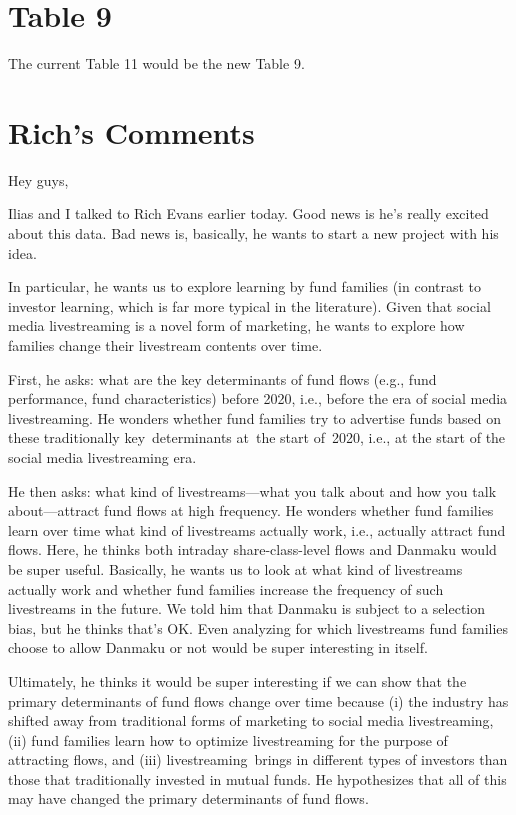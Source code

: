 \documentclass[12pt]{article}
\begin{document}
\section{Table 9}
The current Table 11 would be the new Table 9.

\section*{Rich's Comments}

Hey guys,

Ilias and I talked to Rich Evans earlier today. Good news is he's really excited about this data. Bad news is, basically, he wants to start a new project with his idea.

In particular, he wants us to explore learning by fund families (in contrast to investor learning, which is far more typical in the literature). Given that social media livestreaming is a novel form of marketing, he wants to explore how families change their livestream contents over time.

First, he asks: what are the key determinants of fund flows (e.g., fund performance, fund characteristics) before 2020, i.e., before the era of social media livestreaming.
He wonders whether fund families try to advertise funds based on these traditionally key determinants at the start of 2020, i.e., at the start of the social media livestreaming era.

He then asks: what kind of livestreams---what you talk about and how you talk about---attract fund flows at high frequency.
He wonders whether fund families learn over time what kind of livestreams actually work, i.e., actually attract fund flows. Here, he thinks both intraday share-class-level flows and Danmaku would be super useful. Basically, he wants us to look at what kind of livestreams actually work and whether fund families increase the frequency of such livestreams in the future. We told him that Danmaku is subject to a selection bias, but he thinks that's OK. Even analyzing for which livestreams fund families choose to allow Danmaku or not would be super interesting in itself.

Ultimately, he thinks it would be super interesting if we can show that the primary determinants of fund flows change over time because (i) the industry has shifted away from traditional forms of marketing to social media livestreaming, (ii) fund families learn how to optimize livestreaming for the purpose of attracting flows, and (iii) livestreaming brings in different types of investors than those that traditionally invested in mutual funds. He hypothesizes that all of this may have changed the primary determinants of fund flows.
\end{document}
